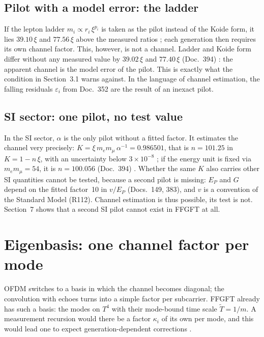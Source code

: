 \subsection{Pilot with a model error: the ladder}

If the lepton ladder $m_i\propto r_i\,\xi^{p_i}$ is taken as the pilot instead of the Koide form, it
lies $39.10\,\xi$ and $77.56\,\xi$ above the measured ratios \KM; each generation then requires its
own channel factor. This, however, is not a channel. Ladder and Koide form differ without any measured
value by $39.02\,\xi$ and $77.40\,\xi$ (Doc.~394) \KM: the apparent channel is the model error of the
pilot. This is exactly what the condition in Section~3.1 warns against. In the language of channel
estimation, the falling residuals $\varepsilon_i$ from Doc.~352 are the result of an inexact pilot.

\subsection{SI sector: one pilot, no test value}

In the SI sector, $\alpha$ is the only pilot without a fitted factor. It estimates the channel very
precisely: $K=\xi\,m_em_\mu\,\alpha^{-1}=0.986501$, that is $n=101.25$ in $K=1-n\,\xi$, with an
uncertainty below $3\times10^{-8}$ \KM; if the energy unit is fixed via $m_em_\mu=54$, it is
$n=100.056$ (Doc.~394) \KM. Whether the same $K$ also carries other SI quantities cannot be tested,
because a second pilot is missing: $E_P$ and $G$ depend on the fitted factor~10 in $v/E_P$
(Docs.~149, 383), and $v$ is a convention of the Standard Model (R112). Channel estimation is thus
possible, its test is not. Section~7 shows that a second SI pilot cannot exist in FFGFT at all.

\section{Eigenbasis: one channel factor per mode}

OFDM switches to a basis in which the channel becomes diagonal; the convolution with echoes turns into a
simple factor per subcarrier. FFGFT already has such a basis: the modes on $T^4$ with their
mode-bound time scale $\tilde T=1/m$. A measurement recursion would there be a factor $\kappa_i$ of
its own per mode, and this would lead one to expect generation-dependent corrections \SM.

